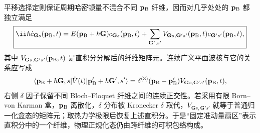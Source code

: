 平移选择定则保证周期哈密顿量不混合不同 $\mathbf p_{\rm B}$ 纤维，因而对几乎处处的 $\mathbf p_{\rm B}$ 都独立满足
\begin{equation}
\boxed{
\ii\hbar\dot c_{\mathbf Gs}(\mathbf p_{\rm B},t)
=E(\mathbf p_{\rm B}+\hbar\mathbf G)c_{\mathbf Gs}(\mathbf p_{\rm B},t)
+\sum_{\mathbf G',s'}
V_{\mathbf Gs,\mathbf G's'}(\mathbf p_{\rm B},t)
 c_{\mathbf G's'}(\mathbf p_{\rm B},t),}
\label{eq:general_reciprocal_lattice_momentum_equation}
\end{equation}
其中 $V_{\mathbf Gs,\mathbf G's'}(\mathbf p_{\rm B},t)$ 是直积分分解后的纤维矩阵元。连续广义平面波核与它的关系应写成
\begin{equation*}
\langle\mathbf p_{\rm B}+\hbar\mathbf G,s|\hat V(t)|
\mathbf p_{\rm B}'+\hbar\mathbf G',s'\rangle
=
\delta^{(3)}(\mathbf p_{\rm B}-\mathbf p_{\rm B}')
V_{\mathbf Gs,\mathbf G's'}(\mathbf p_{\rm B},t),
\end{equation*}
右侧 $\delta$ 因子保留不同 Bloch--Floquet 纤维之间的连续正交性。若采用有限 Born--von Karman 盒，$\mathbf p_{\rm B}$ 离散化，$\delta$ 分布被 Kronecker $\delta$ 取代，$V_{\mathbf Gs,\mathbf G's'}$ 就等于普通归一化盒态的矩阵元；取热力学极限后恢复上述直积分。于是“固定准动量扇区”表示直积分中的一个纤维，物理正规化态仍由跨纤维的可积包络构成。

